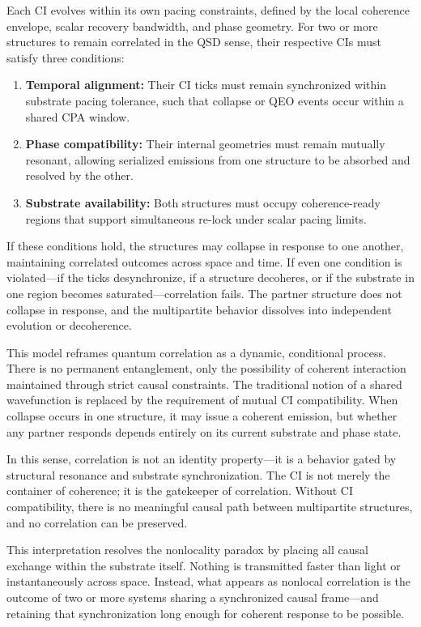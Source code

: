 \documentclass[preprints,article,submit,pdftex,moreauthors]{Definitions/mdpi}
\begin{document}
Each CI evolves within its own pacing constraints, defined by the local coherence envelope, scalar recovery bandwidth, and phase geometry. For two or more structures to remain correlated in the QSD sense, their respective CIs must satisfy three conditions:
\begin{enumerate}
    \item \textbf{Temporal alignment:} Their CI ticks must remain synchronized within substrate pacing tolerance, such that collapse or QEO events occur within a shared CPA window.
    \item \textbf{Phase compatibility:} Their internal geometries must remain mutually resonant, allowing serialized emissions from one structure to be absorbed and resolved by the other.
    \item \textbf{Substrate availability:} Both structures must occupy coherence-ready regions that support simultaneous re-lock under scalar pacing limits.
\end{enumerate}

If these conditions hold, the structures may collapse in response to one another, maintaining correlated outcomes across space and time. If even one condition is violated—if the ticks desynchronize, if a structure decoheres, or if the substrate in one region becomes saturated—correlation fails. The partner structure does not collapse in response, and the multipartite behavior dissolves into independent evolution or decoherence.

This model reframes quantum correlation as a dynamic, conditional process. There is no permanent entanglement, only the possibility of coherent interaction maintained through strict causal constraints. The traditional notion of a shared wavefunction is replaced by the requirement of mutual CI compatibility. When collapse occurs in one structure, it may issue a coherent emission, but whether any partner responds depends entirely on its current substrate and phase state.

In this sense, correlation is not an identity property—it is a behavior gated by structural resonance and substrate synchronization. The CI is not merely the container of coherence; it is the gatekeeper of correlation. Without CI compatibility, there is no meaningful causal path between multipartite structures, and no correlation can be preserved.

This interpretation resolves the nonlocality paradox by placing all causal exchange within the substrate itself. Nothing is transmitted faster than light or instantaneously across space. Instead, what appears as nonlocal correlation is the outcome of two or more systems sharing a synchronized causal frame—and retaining that synchronization long enough for coherent response to be possible.
\end{document}

